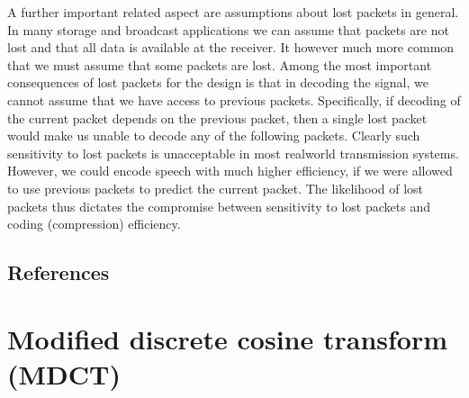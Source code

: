 \documentclass[letterpaper,10pt,english]{jupyterBook}
\begin{document}
\sphinxAtStartPar
A further important related aspect are assumptions about lost packets in
general. In many storage and broadcast applications we can assume that
packets are not lost and that all data is available at the receiver. It
however much more common that we must assume that some packets are lost.
Among the most important consequences of lost packets for the design is
that in decoding the signal, we cannot assume that we have access to
previous packets. Specifically, if decoding of the current packet
depends on the previous packet, then a single lost packet would make us
unable to decode any of the following packets. Clearly such sensitivity
to lost packets is unacceptable in most real\sphinxhyphen{}world transmission systems.
However, we could encode speech with much higher efficiency, if we were
allowed to use previous packets to predict the current packet. The
likelihood of lost packets thus dictates the compromise between
sensitivity to lost packets and coding (compression) efficiency.


\subsection{References}
\label{\detokenize{Transmission/Design_goals:references}}
\sphinxstepscope


\section{Modified discrete cosine transform (MDCT)}
\label{\detokenize{Transmission/Modified_discrete_cosine_transform_MDCT:modified-discrete-cosine-transform-mdct}}\label{\detokenize{Transmission/Modified_discrete_cosine_transform_MDCT::doc}}
\end{document}
